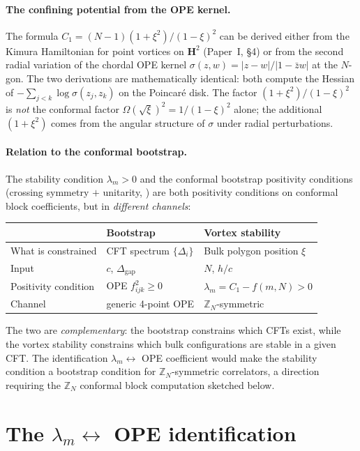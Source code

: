 \paragraph{The confining potential from the OPE kernel.}
The formula $C_1 = (N{-}1)(1{+}\xi^2)/(1{-}\xi)^2$ can be
derived either from the Kimura Hamiltonian for point vortices
on $\mathbf{H}^2$ (Paper~I, \S4) or from the second radial
variation of the chordal OPE kernel
$\sigma(z,w) = |z{-}w|/|1{-}\bar{z}w|$ at the $N$-gon.
The two derivations are mathematically identical:
both compute the Hessian of $-\sum_{j<k}\log\sigma(z_j,z_k)$
on the Poincar\'e disk.
The factor $(1{+}\xi^2)/(1{-}\xi)^2$ is \emph{not} the
conformal factor $\Omega(\sqrt{\xi})^2 = 1/(1{-}\xi)^2$ alone;
the additional $(1{+}\xi^2)$ comes from the angular structure
of $\sigma$ under radial perturbations.

\paragraph{Relation to the conformal bootstrap.}
The stability condition $\lambda_m > 0$ and the conformal
bootstrap positivity conditions (crossing symmetry $+$
unitarity, \citealt{Rattazzi2008}) are both positivity
conditions on conformal block coefficients, but in
\emph{different channels}:
\begin{center}
\begin{tabular}{lll}
\toprule
& Bootstrap & Vortex stability \\
\midrule
What is constrained &
  CFT spectrum $\{\Delta_i\}$ &
  Bulk polygon position $\xi$ \\
Input &
  $c$, $\Delta_{\mathrm{gap}}$ &
  $N$, $h/c$ \\
Positivity condition &
  OPE $f_{ijk}^2 \ge 0$ &
  $\lambda_m = C_1 - f(m,N) > 0$ \\
Channel &
  generic 4-point OPE &
  $\mathbb{Z}_N$-symmetric \\
\bottomrule
\end{tabular}
\end{center}
The two are \emph{complementary}: the bootstrap constrains
which CFTs exist, while the vortex stability constrains
which bulk configurations are stable in a given CFT.
The identification $\lambda_m \leftrightarrow$
OPE coefficient would make the stability condition a
bootstrap condition for $\mathbb{Z}_N$-symmetric
correlators, a direction requiring the $\mathbb{Z}_N$
conformal block computation sketched below.

\section{The $\lambda_m \leftrightarrow$ OPE identification}
\label{sec:ope-identification}

